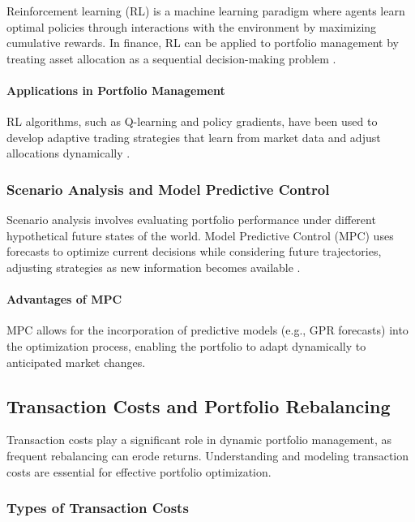 Reinforcement learning (RL) is a machine learning paradigm where agents learn optimal policies through interactions with the environment by maximizing cumulative rewards. In finance, RL can be applied to portfolio management by treating asset allocation as a sequential decision-making problem \cite{moody1998performance}.

\paragraph{Applications in Portfolio Management}

RL algorithms, such as Q-learning and policy gradients, have been used to develop adaptive trading strategies that learn from market data and adjust allocations dynamically \cite{almahdi2019adaptive}.

\subsubsection{Scenario Analysis and Model Predictive Control}

Scenario analysis involves evaluating portfolio performance under different hypothetical future states of the world. Model Predictive Control (MPC) uses forecasts to optimize current decisions while considering future trajectories, adjusting strategies as new information becomes available \cite{primbs2009dynamic}.

\paragraph{Advantages of MPC}

MPC allows for the incorporation of predictive models (e.g., GPR forecasts) into the optimization process, enabling the portfolio to adapt dynamically to anticipated market changes.

\subsection{Transaction Costs and Portfolio Rebalancing}

Transaction costs play a significant role in dynamic portfolio management, as frequent rebalancing can erode returns. Understanding and modeling transaction costs are essential for effective portfolio optimization.

\subsubsection{Types of Transaction Costs}

